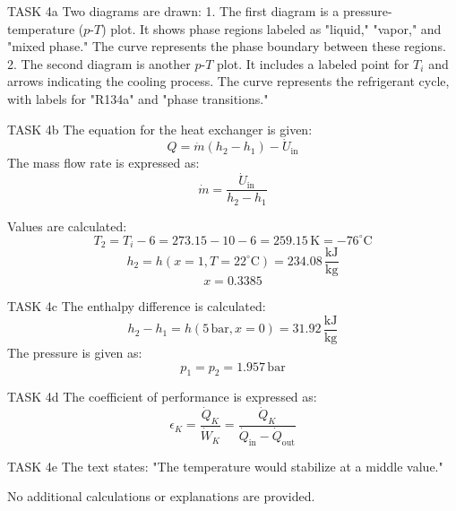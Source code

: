 TASK 4a  
Two diagrams are drawn:  
1. The first diagram is a pressure-temperature (\(p\)-\(T\)) plot. It shows phase regions labeled as "liquid," "vapor," and "mixed phase." The curve represents the phase boundary between these regions.  
2. The second diagram is another \(p\)-\(T\) plot. It includes a labeled point for \(T_i\) and arrows indicating the cooling process. The curve represents the refrigerant cycle, with labels for "R134a" and "phase transitions."  

TASK 4b  
The equation for the heat exchanger is given:  
\[
Q = \dot{m} (h_2 - h_1) - \dot{U}_\text{in}
\]  
The mass flow rate is expressed as:  
\[
\dot{m} = \frac{\dot{U}_\text{in}}{h_2 - h_1}
\]  

Values are calculated:  
\[
T_2 = T_i - 6 = 273.15 - 10 - 6 = 259.15 \, \text{K} = -76^\circ\text{C}
\]  
\[
h_2 = h(x=1, T=22^\circ\text{C}) = 234.08 \, \frac{\text{kJ}}{\text{kg}}
\]  
\[
x = 0.3385
\]  

TASK 4c  
The enthalpy difference is calculated:  
\[
h_2 - h_1 = h(5 \, \text{bar}, x=0) = 31.92 \, \frac{\text{kJ}}{\text{kg}}
\]  
The pressure is given as:  
\[
p_1 = p_2 = 1.957 \, \text{bar}
\]  

TASK 4d  
The coefficient of performance is expressed as:  
\[
\epsilon_K = \frac{\dot{Q}_K}{\dot{W}_K} = \frac{\dot{Q}_K}{\dot{Q}_\text{in} - \dot{Q}_\text{out}}
\]  

TASK 4e  
The text states:  
"The temperature would stabilize at a middle value."  

No additional calculations or explanations are provided.
